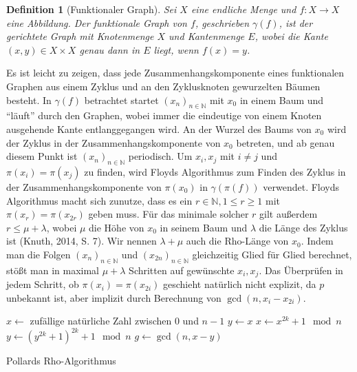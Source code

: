 \documentclass[a4paper, 10pt, ngerman]{article}
\newcommand{\N}{\mathbb{N}}
\newtheorem{definition}{Definition}
\begin{document}
\begin{definition}[Funktionaler Graph]
    Sei $X$ eine endliche Menge und $f: X \to X$ eine Abbildung. Der funktionale Graph von $f$, geschrieben $\gamma(f)$, ist der gerichtete Graph mit Knotenmenge $X$ und Kantenmenge $E$, wobei die Kante $(x, y) \in X \times X$ genau dann in $E$ liegt, wenn $f(x) = y$.
\end{definition}

\noindent Es ist leicht zu zeigen, dass jede Zusammenhangskomponente eines funktionalen Graphen aus einem Zyklus und an den Zyklusknoten gewurzelten Bäumen besteht. In $\gamma(f)$ betrachtet startet $(x_n)_{n \in \N}$ mit $x_0$ in einem Baum und "`läuft"' durch den Graphen, wobei immer die eindeutige von einem Knoten ausgehende Kante entlanggegangen wird. An der Wurzel des Baums von $x_0$ wird der Zyklus in der Zusammenhangskomponente von $x_0$ betreten, und ab genau diesem Punkt ist $(x_n)_{n \in \N}$ periodisch. Um $x_i, x_j$ mit $i \ne j$ und $\pi(x_i) = \pi(x_j)$ zu finden, wird Floyds Algorithmus zum Finden des Zyklus in der Zusammenhangskomponente von $\pi(x_0)$ in $\gamma(\pi(f))$ verwendet. Floyds Algorithmus macht sich zunutze, dass es ein $r \in \N, 1 \le r \ge 1$ mit $\pi(x_r) = \pi(x_{2r})$ geben muss. Für das minimale solcher $r$ gilt außerdem $r \le \mu + \lambda$, wobei $\mu$ die Höhe von $x_0$ in seinem Baum und $\lambda$ die Länge des Zyklus ist (Knuth, 2014, S. 7). Wir nennen $\lambda + \mu$ auch die Rho-Länge von $x_0$. Indem man die Folgen $(x_n)_{n \in \N}$ und $(x_{2n})_{n \in \N}$ gleichzeitig Glied für Glied berechnet, stößt man in maximal $\mu + \lambda$ Schritten auf gewünschte $x_i, x_j$. Das Überprüfen in jedem Schritt, ob $\pi(x_i) = \pi(x_{2i})$ geschieht natürlich nicht explizit, da $p$ unbekannt ist, aber implizit durch Berechnung von $\gcd(n, x_i - x_{2i})$.

\begin{algorithm*}
    $x \gets $ zufällige natürliche Zahl zwischen $0$ und $n - 1$ \;
    $y \gets x$ \;
    {
        $x \gets x^{2k} + 1 \mod n$ \;
        $y \gets (y^{2k} + 1)^{2k} + 1 \mod n$ \;
        $g \gets \gcd(n, x - y)$ \;
        {
             \;
        }
    }

    \caption{Pollards Rho-Algorithmus}
\end{algorithm*}
\end{document}
